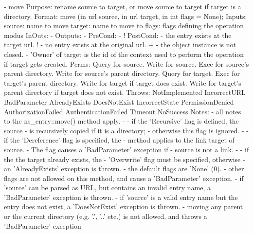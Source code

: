 \begin{myspec}
 
    - move
      Purpose:  rename source to target, or move source to
                target if target is a directory.
      Format:   move               (in  url        source,
                                    in  url        target,
                                    in  int     flags = None);
      Inputs:   source:             name to move
                target:             name to move to
                flags:              flags defining the operation
                                    modus
      InOuts:   -
      Outputs:  -
      PreCond:  -
!     PostCond: - the entry exists at the target url.
!               - no entry exists at the original url.
+               - the object instance is not closed.
                - 'Owner' of target is the id of the context
                  used to perform the operation if target gets
                  created.
      Perms:    Query for source.
                Write for source.
                Exec  for source's parent directory.
                Write for source's parent directory.
                Query for target.
                Exec  for target's parent directory.
                Write for target
                      if  target does exist.
                Write for target's parent directory 
                      if  target does not exist.
      Throws:   NotImplemented
                IncorrectURL
                BadParameter
                AlreadyExists
                DoesNotExist
                IncorrectState
                PermissionDenied
                AuthorizationFailed
                AuthenticationFailed
                Timeout
                NoSuccess
      Notes:    - all notes to the ns_entry::move() method
                  apply.
 -              - if the 'Recursive' flag is defined, the source
 -                is recursively copied if it is a directory;
 -                otherwise this flag is ignored.
 -              - if the 'Dereference' flag is specified, the
 -                method applies to the link target of source.
 -                The flag causes a 'BadParameter' exception if
 -                source is not a link.
 -              - if the the target already exists, the 
 -                'Overwrite' flag must be specified, otherwise
 -                an 'AlreadyExists' exception is thrown.
                - the default flags are 'None' (0).
                - other flags are not allowed on this method, 
                  and cause a 'BadParameter' exception.
                - if 'source' can be parsed as URL, but contains 
                  an invalid entry name, a 'BadParameter'
                  exception is thrown.
                - if 'source' is a valid entry name but the entry
                  does not exist, a 'DoesNotExist' exception is
                  thrown.
                - moving any parent or the current directory 
                  (e.g.  '.', '..' etc.) is not allowed, and 
                  throws a 'BadParameter' exception
 

\end{myspec}
